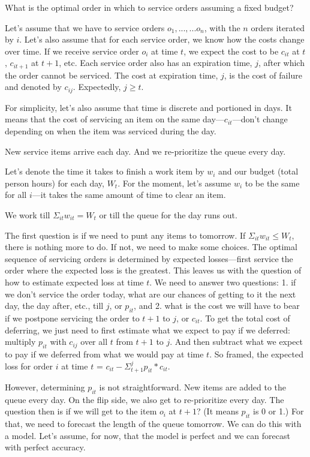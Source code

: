 \documentclass[12pt, letterpaper]{article}
\begin{document}
What is the optimal order in which to service orders assuming a fixed budget?

Let's assume that we have to service orders $o_1,...,...o_n$, with the $n$ orders iterated by $i$. Let's also assume that for each service order, we know how the costs change over time. If we receive service order $o_i$ at time $t$, we expect the cost to be $c_{it}$ at $t$, $c_{it+1}$ at $t+1$, etc. Each service order also has an expiration time, $j$, after which the order cannot be serviced. The cost at expiration time, $j$, is the cost of failure and denoted by $c_{ij}$. Expectedly, $j \geq t$.

For simplicity, let's also assume that time is discrete and portioned in days. It means that the cost of servicing an item on the same day---$c_{it}$---don't change depending on when the item was serviced during the day.

New service items arrive each day. And we re-prioritize the queue every day.

Let's denote the time it takes to finish a work item by $w_i$ and our budget (total person hours) for each day, $W_t$. For the moment, let's assume $w_i$ to be the same for all $i$---it takes the same amount of time to clear an item.

We work till $\Sigma_{it} w_{it} = W_t$ or till the queue for the day runs out. 

The first question is if we need to punt any items to tomorrow. If $\Sigma_{it} w_{it} \leq W_t$, there is nothing more to do. If not, we need to make some choices. The optimal sequence of servicing orders is determined by expected losses---first service the order where the expected loss is the greatest. This leaves us with the question of how to estimate expected loss at time $t$. We need to answer two questions: 1. if we don't service the order today, what are our chances of getting to it the next day, the day after, etc., till $j$, or $p_{it}$, and 2. what is the cost we will have to bear if we postpone servicing the order to $t+1$ to $j$, or $c_{it}$. To get the total cost of deferring, we just need to first estimate what we expect to pay if we deferred: multiply $p_{it}$ with $c_{ij}$ over all $t$ from $t+1$ to $j$. And then subtract what we expect to pay if we deferred from what we would pay at time $t$. So framed, the expected loss for order $i$ at time $t$ = $c_{it} - \Sigma_{t+1}^{j} p_{it} * c_{it}$.

However, determining $p_{it}$ is not straightforward. New items are added to the queue every day. On the flip side, we also get to re-prioritize every day. The question then is if we will get to the item $o_i$ at $t+1$? (It means $p_{it}$ is 0 or 1.) For that, we need to forecast the length of the queue tomorrow. We can do this with a model. Let's assume, for now, that the model is perfect and we can forecast with perfect accuracy. 
\end{document}
